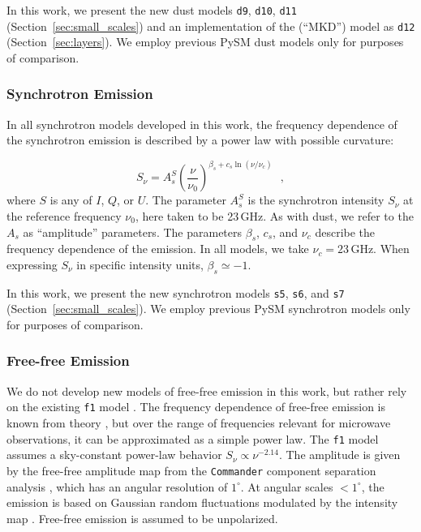 \documentclass[twocolumn]{aastex631}
\begin{document}
In this work, we present the new dust models \texttt{d9}, \texttt{d10}, \texttt{d11} (Section~\ref{sec:small_scales}) and an implementation of the \citet{Martinez-Solaeche:2018} (``MKD'') model as \texttt{d12} (Section~\ref{sec:layers}). We employ previous PySM dust models only for purposes of comparison.

\subsubsection{Synchrotron Emission} \label{subsubsec:synch_model}
In all synchrotron models developed in this work, the frequency dependence of the synchrotron emission is described by a power law with possible curvature:

\begin{equation} \label{eq:synch-emission-law}
    S_\nu = A_s^S \left(\frac{\nu}{\nu_0}\right)^{\beta_s + c_s \ln\left(\nu/\nu_c\right)}
    ~~~,
\end{equation}
where $S$ is any of $I$, $Q$, or $U$. The parameter $A_s^S$ is the synchrotron intensity $S_\nu$ at the reference frequency $\nu_0$, here taken to be 23\,GHz. As with dust, we refer to the $A_s$ as ``amplitude'' parameters. The parameters $\beta_s$, $c_s$, and $\nu_c$ describe the frequency dependence of the emission. In all models, we take $\nu_c = 23$\,GHz. When expressing $S_\nu$ in specific intensity units, $\beta_s \simeq -1$.

In this work, we present the new synchrotron models \texttt{s5}, \texttt{s6}, and \texttt{s7} (Section~\ref{sec:small_scales}). We employ previous PySM synchrotron models only for purposes of comparison.

\subsubsection{Free-free Emission}
We do not develop new models of free-free emission in this work, but rather rely on the existing \texttt{f1} model \citep{Thorne:2017}. The frequency dependence of free-free emission is known from theory \citep[][and references therein]{Draine:2011}, but over the range of frequencies relevant for microwave observations, it can be approximated as a simple power law. The \texttt{f1} model assumes a sky-constant power-law behavior $S_\nu \propto \nu^{-2.14}$. The amplitude is given by the free-free amplitude map from the \texttt{Commander} component separation analysis \citep{planck2014-a12}, which has an angular resolution of $1^\circ$. At angular scales $<1^\circ$, the emission is based on Gaussian random fluctuations modulated by the intensity map \citep[see][for details]{Thorne:2017}. Free-free emission is assumed to be unpolarized.
\end{document}
